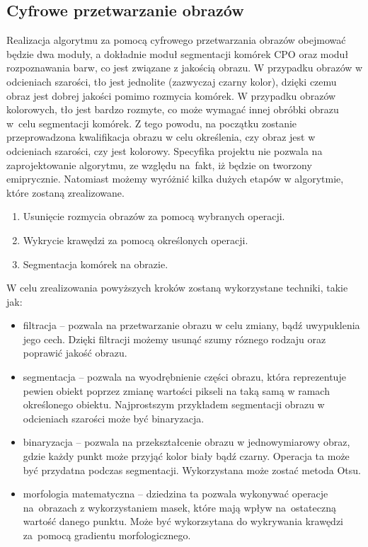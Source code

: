 \documentclass[a4paper]{article}
\begin{document}
\subsection{Cyfrowe przetwarzanie obrazów}
Realizacja algorytmu za pomocą cyfrowego przetwarzania obrazów obejmować będzie dwa moduły, a dokładnie moduł segmentacji komórek CPO oraz moduł rozpoznawania barw, co jest związane z jakością obrazu. W przypadku obrazów w odcieniach szarości, tło jest jednolite (zazwyczaj czarny kolor), dzięki czemu obraz jest dobrej jakości pomimo rozmycia komórek. W przypadku obrazów kolorowych, tło jest bardzo rozmyte, co może wymagać innej obróbki obrazu w~celu segmentacji komórek. Z tego powodu, na początku zostanie przeprowadzona kwalifikacja obrazu w celu określenia, czy obraz jest w odcieniach szarości, czy jest kolorowy.
\newline \newline
Specyfika projektu nie pozwala na zaprojektowanie algorytmu, ze względu na~fakt, iż będzie on tworzony emiprycznie. Natomiast możemy wyróżnić kilka dużych etapów w algorytmie, które zostaną zrealizowane.
\begin{enumerate}
    \item Usunięcie rozmycia obrazów za pomocą wybranych operacji.
    \item Wykrycie krawędzi za pomocą określonych operacji.
    \item Segmentacja komórek na obrazie.
\end{enumerate}
W celu zrealizowania powyższych kroków zostaną wykorzystane techniki, takie jak:
\begin{itemize}
    \item filtracja -- pozwala na przetwarzanie obrazu w celu zmiany, bądź uwypuklenia jego cech. Dzięki filtracji możemy usunąć szumy róznego rodzaju oraz poprawić jakość obrazu.
    \item segmentacja -- pozwala na wyodrębnienie części obrazu, która reprezentuje pewien obiekt poprzez zmianę wartości pikseli na taką samą w ramach określonego obiektu. Najprostszym przykładem segmentacji obrazu w odcieniach szarości może być binaryzacja.
    \item binaryzacja -- pozwala na przekształcenie obrazu w jednowymiarowy obraz, gdzie każdy punkt może przyjąć kolor biały bądź czarny. Operacja ta może być przydatna podczas segmentacji. Wykorzystana może zostać metoda Otsu.
    \item morfologia matematyczna -- dziedzina ta pozwala wykonywać operacje na~obrazach z wykorzystaniem masek, które mają wpływ na~ostateczną wartość danego punktu. Może być wykorzsytana do wykrywania krawędzi za~pomocą gradientu morfologicznego.
\end{itemize}
\end{document}
